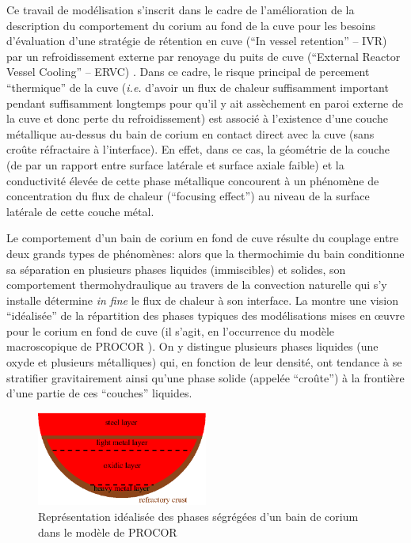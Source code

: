 Ce travail de modélisation s'inscrit dans le cadre de l'amélioration de la description du comportement du corium au fond de la cuve pour les besoins d'évaluation d'une stratégie de rétention en cuve (``In vessel retention'' -- IVR) par un refroidissement externe par renoyage du puits de cuve (``External Reactor Vessel Cooling'' -- ERVC) \cite{Theofanous1997, Kymalainen1997}. Dans ce cadre, le risque principal de percement ``thermique'' de la cuve (\textit{i.e.} d'avoir un flux de chaleur suffisamment important pendant suffisamment longtemps pour qu'il y ait assèchement en paroi externe de la cuve et donc perte du refroidissement) est associé à l'existence d'une couche métallique au-dessus du bain de corium en contact direct avec la cuve (sans croûte réfractaire à l'interface). En effet, dans ce cas, la géométrie de la couche (de par un rapport entre surface latérale et surface axiale faible) et la conductivité élevée de cette phase métallique concourent à un phénomène de concentration du flux de chaleur (``focusing effect'') au niveau de la surface latérale de cette couche métal.

Le comportement d'un bain de corium en fond de cuve résulte du couplage entre deux grands types de phénomènes: alors que la thermochimie du bain conditionne sa séparation en plusieurs phases liquides (immiscibles) et solides, son comportement thermohydraulique au travers de la convection naturelle qui s'y installe détermine \textit{in fine} le flux de chaleur à son interface. La  montre une vision ``idéalisée'' de la répartition des phases typiques des modélisations mises en \oe{}uvre pour le corium en fond de cuve (il s'agit, en l’occurrence du modèle macroscopique de PROCOR \cite{LeTellier2015}). On y distingue plusieurs phases liquides (une oxyde et plusieurs métalliques) qui, en fonction de leur densité, ont tendance à se stratifier gravitairement ainsi qu'une phase solide (appelée ``croûte'') à la frontière d'une partie de ces ``couches'' liquides. 

\begin{figure}[H]
 \centering
 \includegraphics[width=0.5\textwidth]{Figures/multilayer.eps}
 \caption{Représentation idéalisée des phases ségrégées d'un bain de corium dans le modèle de PROCOR}
 \label{fig:corium_stratif}
\end{figure}

